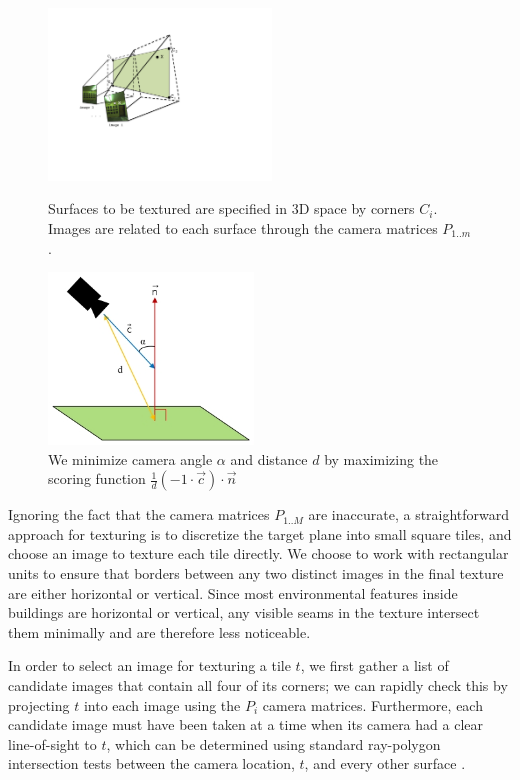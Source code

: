 \documentclass[]{spie}  %
\begin{document}
\begin{figure}
  \begin{minipage}[b]{0.45\linewidth}
    \centering
    \includegraphics[height=1.8in]{Projection.pdf}
    \caption{Surfaces to be textured are specified in 3D space by
      corners $C_i$. Images are related to each surface through the
      camera matrices $P_{1..m}$. }
    \label{fig:projection}
  \end{minipage}
  \hspace{0.5cm}
  \begin{minipage}[b]{0.45\linewidth}
    \centering
    \includegraphics[height=1.8in]{scoringFunction.jpg}
    \caption{We minimize camera angle $\alpha$ and distance $d$ by
      maximizing the scoring function $\frac{1}{d} (-1 \cdot \vec{c})
      \cdot \vec{n}$}
    \label{fig:scoringFunction}
  \end{minipage}
\end{figure}


Ignoring the fact that the camera matrices $P_{1..M}$ are inaccurate,
a straightforward approach for texturing is to discretize the target
plane into small square tiles, and choose an image to texture each
tile directly. We choose to work with rectangular units to ensure that
borders between any two distinct images in the final texture are
either horizontal or vertical. Since most environmental features
inside buildings are horizontal or vertical, any visible seams in the
texture intersect them minimally and are therefore less noticeable.

In order to select an image for texturing a tile $t$, we first gather
a list of candidate images that contain all four of its corners; we
can rapidly check this by projecting $t$ into each image using the
$P_i$ camera matrices. Furthermore, each candidate image must have
been taken at a time when its camera had a clear line-of-sight to $t$,
which can be determined using standard ray-polygon intersection tests
between the camera location, $t$, and every other surface
\cite{rayintersection}.
\end{document}
